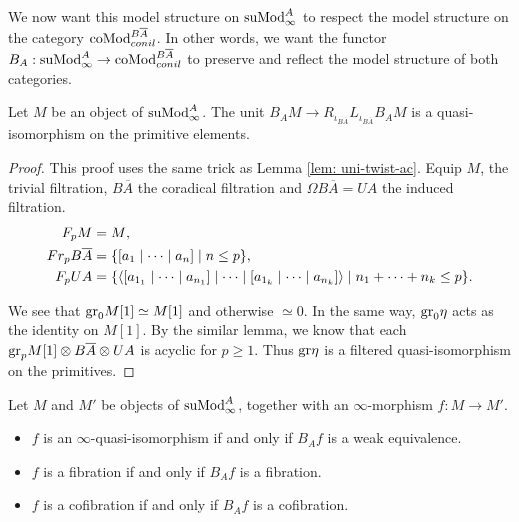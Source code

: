 \documentclass[../thesis.tex]{subfiles}
\begin{document}
            We now want this model structure on $\tt{suMod}^A_\infty$ to respect the model structure on the category $\tt{coMod}_{conil}^{B\overline{A}}$. In other words, we want the functor $B_A: \tt{suMod}_\infty^A \to \tt{coMod}_{conil}^{B\overline{A}}$ to preserve and reflect the model structure of both categories.

            \begin{lemma}
                Let $M$ be an object of $\tt{suMod}_\infty^A$. The unit $B_AM \to R_{\iota_{B\overline{A}}}L_{\iota_{B\overline{A}}}B_AM$ is a quasi-isomorphism on the primitive elements.
            \end{lemma}

            \begin{proof}
                This proof uses the same trick as Lemma \ref{lem: uni-twist-ac}. Equip $M$, the trivial filtration, $B\overline{A}$ the coradical filtration and $\Omega B\overline{A} = UA$ the induced filtration.
                \begin{align*}
                    F_pM & = M\tt{,} \\
                    Fr_pB\overline{A} & = \startset{[a_1 \mid \cdots \mid a_n] \mid n \leq p}\tt{,} \\
                    F_p UA & = \startset{\langle [a_{1_1} \mid \cdots \mid a_{n_1}] \mid \cdots \mid [a_{1_k} \mid \cdots \mid a_{n_k}] \rangle \mid n_1 + \cdots + n_k \leq p}\tt{.}
                \end{align*} 

                We see that $\tt{gr}_0M[1] \simeq M[1]$ and otherwise $\simeq 0$. In the same way, $\tt{gr}_0\eta$ acts as the identity on $M[1]$. By the similar lemma, we know that each $\tt{gr}_p M[1] \otimes B\overline{A} \otimes UA$ is acyclic for $p \geq 1$. Thus $\tt{gr}\eta$ is a filtered quasi-isomorphism on the primitives.

            \end{proof}

            \begin{proposition}
                Let $M$ and $M'$ be objects of $\tt{suMod}_\infty^A$, together with an $\infty$-morphism $f : M \to M'$.
                \begin{itemize}
                    \item $f$ is an $\infty$-quasi-isomorphism if and only if $B_Af$ is a weak equivalence.
                    \item $f$ is a fibration if and only if $B_Af$ is a fibration.
                    \item $f$ is a cofibration if and only if $B_Af$ is a cofibration.
                \end{itemize}
            \end{proposition}
\end{document}

